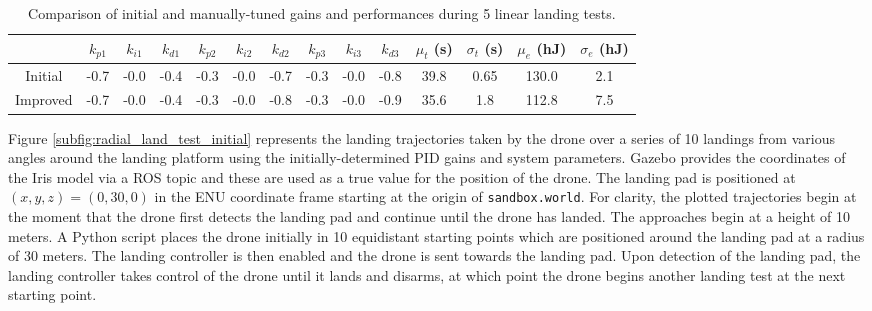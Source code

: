 \begin{table}[ht]
    \centering
    \resizebox{\textwidth}{!}
    { 
    \begin{tabular}{|c|c|c|c|c|c|c|c|c|c|c|c|c|c|}
    \cline{2-14}
    	\multicolumn{1}{c|}{} & $k_{p1}$ & $k_{i1}$ & $k_{d1}$ & $k_{p2}$ & $k_{i2}$ & $k_{d2}$ & $k_{p3}$ & $k_{i3}$ & $k_{d3}$ & $\mu_t$ (s) & $\sigma_t$ (s) & $\mu_e$ (hJ) & $\sigma_e$ (hJ) \\\hline
    	Initial & -0.7 & -0.0 & -0.4 & -0.3 & -0.0 & -0.7 & -0.3 & -0.0 & -0.8 & 39.8 & 0.65 & 130.0 & 2.1 \\\hline
    	Improved & -0.7 & -0.0 & -0.4 & -0.3 & -0.0 & -0.8 & -0.3 & -0.0 & -0.9 & 35.6 & 1.8 & 112.8 & 7.5 \\\hline
    \end{tabular}
    }
    \caption{Comparison of initial and manually-tuned gains and performances during 5 linear landing tests.}
    \label{tab:linear_land_performance_comparison}
\end{table}

Figure \ref{subfig:radial_land_test_initial} represents the landing trajectories taken by the drone over a series of 10 landings from various angles around the landing platform using the initially-determined PID gains and system parameters. Gazebo provides the coordinates of the Iris model via a ROS topic and these are used as a true value for the position of the drone. The landing pad is positioned at $(x,y,z)=(0,30,0)$ in the ENU coordinate frame starting at the origin of \texttt{sandbox.world}. For clarity, the plotted trajectories begin at the moment that the drone first detects the landing pad and continue until the drone has landed. The approaches begin at a height of 10 meters. A Python script places the drone initially in 10 equidistant starting points which are positioned around the landing pad at a radius of 30 meters. The landing controller is then enabled and the drone is sent towards the landing pad. Upon detection of the landing pad, the landing controller takes control of the drone until it lands and disarms, at which point the drone begins another landing test at the next starting point.

